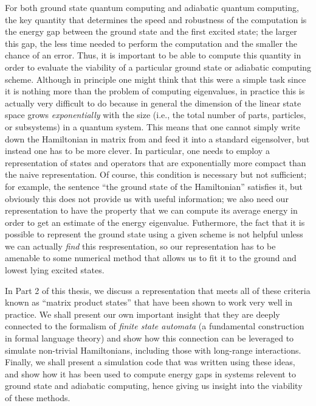 \documentclass{amsbook}
\theoremstyle{plain}
\theoremstyle{definition}
\theoremstyle{remark}
\begin{document}
For both ground state quantum computing and adiabatic quantum computing, the key quantity that determines the speed and robustness of the computation is the energy gap between the ground state and the first excited state;  the larger this gap, the less time needed to perform the computation and the smaller the chance of an error.  Thus, it is important to be able to compute this quantity in order to evaluate the viability of a particular ground state or adiabatic computing scheme.  Although in principle one might think that this were a simple task since it is nothing more than the problem of computing eigenvalues, in practice this is actually very difficult to do because in general the dimension of the linear state space grows \emph{exponentially} with the size (i.e., the total number of parts, particles, or subsystems) in a quantum system.  This means that one cannot simply write down the Hamiltonian in matrix from and feed it into a standard eigensolver, but instead one has to be more clever.  In particular, one needs to employ a representation of states and operators that are exponentially more compact than the naive representation.  Of course,  this condition is necessary but not sufficient;  for example, the sentence ``the ground state of the Hamiltonian'' satisfies it, but obviously this does not provide us with useful information;  we also need our representation to have the property that we can compute its average energy in order to get an estimate of the energy eigenvalue.  Futhermore, the fact that it is possible to represent the ground state using a given scheme is not helpful unless we can actually \emph{find} this respresentation, so our representation has to be amenable to some numerical method that allows us to fit it to the ground and lowest lying excited states.

In Part 2 of this thesis, we discuss a representation that meets all of these criteria known as ``matrix product states'' that have been shown to work very well in practice.  We shall present our own important insight that they are deeply connected to the formalism of \emph{finite state automata} (a fundamental construction in formal language theory) and show how this connection can be leveraged to simulate non-trivial Hamiltonians, including those with long-range interactions.  Finally, we shall present a simulation code that was written using these ideas, and show how it has been used to compute energy gaps in systems relevent to ground state and adiabatic computing, hence giving us insight into the viability of these methods.
\end{document}
